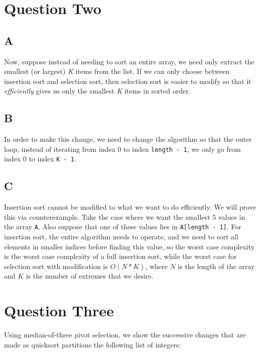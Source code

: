\documentclass[11pt,letterpaper]{article}
\begin{document}
\section{Question Two}
\subsection{A}
Now, suppose instead of needing to sort an entire array, we need only extract the smallest (or largest) \emph{K} items from the list. If we can only choose between insertion sort and selection sort, then selection sort is easier to modify so that it \textit{efficiently} gives us only the smallest \emph{K} items in sorted order. 
\subsection{B}
In order to make this change, we need to change the algorithm so that the outer loop, instead of iterating from index 0 to index \texttt{length - 1}, we only go from index 0 to index \texttt{K - 1}. 
\subsection{C}
Insertion sort cannot be modified to what we want to do efficiently. We will prove this via counterexample. Take the case where we want the smallest 5 values in the array \texttt{A}. Also suppose that one of these values lies in \texttt{A[length - 1]}. For insertion sort, the entire algorithm needs to operate, and we need to sort all elements in smaller indices before finding this value, so the worst case complexity is the worst case complexity of a full insertion sort, while the worst case for selection sort with modification is $O(N*K)$, where $N$ is the length of the array and $K$ is the number of extremes that we desire. 

\section{Question Three}
Using median-of-three pivot selection, we show the successive changes that are made as quicksort partitions the following list of integers:
\newline

\end{document}
